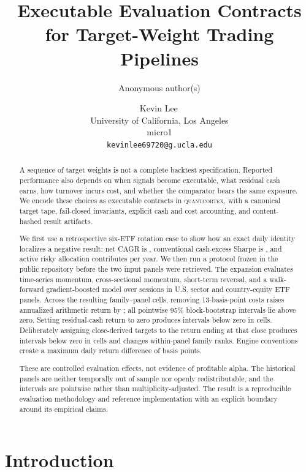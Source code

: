\documentclass{article}
\title{Executable Evaluation Contracts for Target-Weight Trading Pipelines}
\author{Anonymous author(s)}
\author{%
  Kevin Lee\,\orcidlink{0009-0004-0388-9260} \\
  University of California, Los Angeles \\
  micro1 \\
  \texttt{kevinlee69720@g.ucla.edu}
}
\newcommand{\system}{\textsc{quantcortex}}
\begin{document}
\maketitle

\begin{abstract}
A sequence of target weights is not a complete backtest specification.
Reported performance also depends on when signals become executable, what
residual cash earns, how turnover incurs cost, and whether the comparator bears
the same exposure. We encode these choices as executable contracts in
\system, with a canonical target tape, fail-closed invariants, explicit cash and
cost accounting, and content-hashed result artifacts.

We first use a retrospective six-ETF rotation case to show how an exact daily
identity localizes a negative result: net CAGR is \PaperNetCAGR{}, conventional
cash-excess Sharpe is \PaperNetSharpe{}, and active risky allocation contributes
\PaperAllocationMean{} per year. We then run a protocol frozen in the public
repository before the two input panels were retrieved. The expansion evaluates
time-series momentum, cross-sectional momentum, short-term reversal, and a
walk-forward gradient-boosted model over \ExpansionEvaluationSessions{} sessions
in U.S. sector and country-equity ETF panels. Across the resulting
\ExpansionFamilyPanelCount{} family--panel cells, removing 13-basis-point costs
raises annualized arithmetic return by \ExpansionCostEffectRange{}; all
\ExpansionFamilyPanelCount{}
pointwise 95\% block-bootstrap intervals lie above zero. Setting residual-cash
return to zero produces intervals below zero in \ExpansionZeroCashBelowCount{}
cells. Deliberately assigning close-derived targets to the return ending at that
close produces intervals below zero in \ExpansionSameCloseBelowCount{} cells and
changes \ExpansionSameCloseRankChanges{} within-panel family ranks. Engine
conventions create a maximum
daily return difference of \ExpansionEngineMaxDailyBp{} basis points.

These are controlled evaluation effects, not evidence of profitable alpha.
The historical panels are neither temporally out of sample nor openly
redistributable, and the intervals are pointwise rather than
multiplicity-adjusted. The result is a reproducible evaluation methodology and
reference implementation with an explicit boundary around its empirical claims.
\end{abstract}

\section{Introduction}
\end{document}
